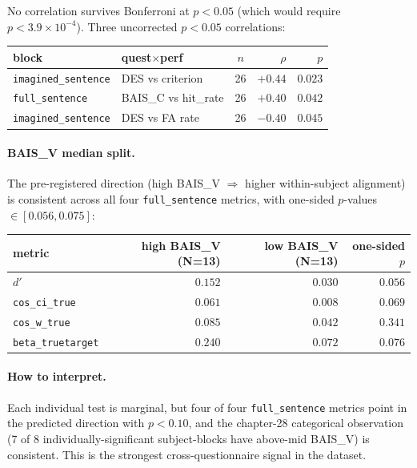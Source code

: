 \documentclass[11pt]{article}
\begin{document}
No correlation survives Bonferroni at $p<0.05$ (which would require
$p<3.9\times 10^{-4}$). Three uncorrected $p<0.05$ correlations:

\begin{center}
\begin{tabular}{llcrr}
\toprule
block & quest$\times$perf & $n$ & $\rho$ & $p$ \\
\midrule
\texttt{imagined\_sentence} & DES vs criterion        & 26 & $+0.44$ & $0.023$ \\
\texttt{full\_sentence}     & BAIS\_C vs hit\_rate    & 26 & $+0.40$ & $0.042$ \\
\texttt{imagined\_sentence} & DES vs FA rate          & 26 & $-0.40$ & $0.045$ \\
\bottomrule
\end{tabular}
\end{center}

\paragraph{BAIS\_V median split.}
The pre-registered direction (high BAIS\_V $\Rightarrow$ higher
within-subject alignment) is consistent across all four
\texttt{full\_sentence} metrics, with one-sided $p$-values
$\in [0.056, 0.075]$:

\begin{center}
\begin{tabular}{lrrr}
\toprule
metric & high BAIS\_V (N=13) & low BAIS\_V (N=13) & one-sided $p$ \\
\midrule
$d'$                  & $0.152$ & $0.030$ & $0.056$ \\
\texttt{cos\_ci\_true}     & $0.061$ & $0.008$ & $0.069$ \\
\texttt{cos\_w\_true}      & $0.085$ & $0.042$ & $0.341$ \\
\texttt{beta\_truetarget}  & $0.240$ & $0.072$ & $0.076$ \\
\bottomrule
\end{tabular}
\end{center}

\paragraph{How to interpret.}
Each individual test is marginal, but four of four \texttt{full\_sentence}
metrics point in the predicted direction with $p<0.10$, and the
chapter-28 categorical observation (7 of 8 individually-significant
subject-blocks have above-mid BAIS\_V) is consistent. This is the
strongest cross-questionnaire signal in the dataset.
\end{document}
